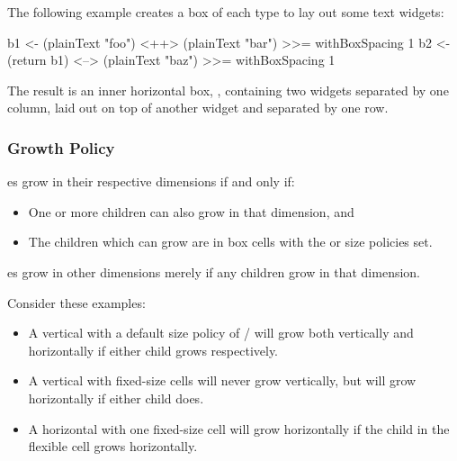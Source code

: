 The following example creates a box of each type to lay out some text
widgets:

\begin{haskellcode}
 b1 <- (plainText "foo") <++> (plainText "bar") >>= withBoxSpacing 1
 b2 <- (return b1) <--> (plainText "baz") >>= withBoxSpacing 1
\end{haskellcode}

The result is an inner horizontal box, , containing two
 widgets separated by one column, laid out on top of
another  widget and separated by one row.

\subsubsection{Growth Policy}

es grow in their respective dimensions if and only if:

\begin{itemize}
\item One or more children can also grow in that dimension, and
\item The children which can grow are in box cells with the
   or  size policies set.
\end{itemize}

es grow in other dimensions merely if any children grow in
that dimension.

Consider these examples:

\begin{itemize}
\item A vertical  with a default size policy of  /
   will grow both vertically and horizontally if either
  child grows respectively.
\item A vertical  with fixed-size cells will never grow
  vertically, but will grow horizontally if either child does.
\item A horizontal  with one fixed-size cell will grow
  horizontally if the child in the flexible cell grows horizontally.
\end{itemize}
